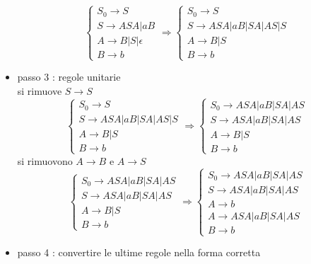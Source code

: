 \documentclass[10pt, letterpaper]{report}
\begin{document}
\begin{itemize}
$$\begin{cases}
        S_0 \longrightarrow S\\
        S\longrightarrow ASA |  aB  \\ 
        A \longrightarrow B| S  | \epsilon \\ 
        B \longrightarrow b
    \end{cases}\Longrightarrow 
    \begin{cases}
        S_0 \longrightarrow S\\
        S\longrightarrow ASA |  aB | SA |AS | S  \\ 
        A \longrightarrow B| S \\ 
        B \longrightarrow b
    \end{cases}$$
\item passo 3 : regole unitarie
\\ si rimuove $S\longrightarrow S$
$$\begin{cases}
    S_0 \longrightarrow S\\
    S\longrightarrow ASA |  aB | SA |AS | S  \\ 
    A \longrightarrow B| S \\ 
    B \longrightarrow b
\end{cases}\Longrightarrow 
\begin{cases}
    S_0 \longrightarrow ASA |  aB | SA |AS \\
    S\longrightarrow ASA |  aB | SA |AS   \\ 
    A \longrightarrow B| S \\ 
    B \longrightarrow b
\end{cases}$$
si rimuovono $A\longrightarrow B$ e $A\longrightarrow S$
$$ 
\begin{cases}
    S_0 \longrightarrow ASA |  aB | SA |AS \\
    S\longrightarrow ASA |  aB | SA |AS   \\ 
    A \longrightarrow B| S \\ 
    B \longrightarrow b
\end{cases}
\Longrightarrow 
\begin{cases}
    S_0 \longrightarrow ASA |  aB | SA |AS \\
    S\longrightarrow ASA |  aB | SA |AS   \\ 
    A \longrightarrow b \\
    A\longrightarrow ASA |  aB | SA |AS \\ 
    B \longrightarrow b
\end{cases}
$$
\item passo 4 : convertire le ultime regole nella forma corretta $$
$$
\end{itemize}
\end{document}
